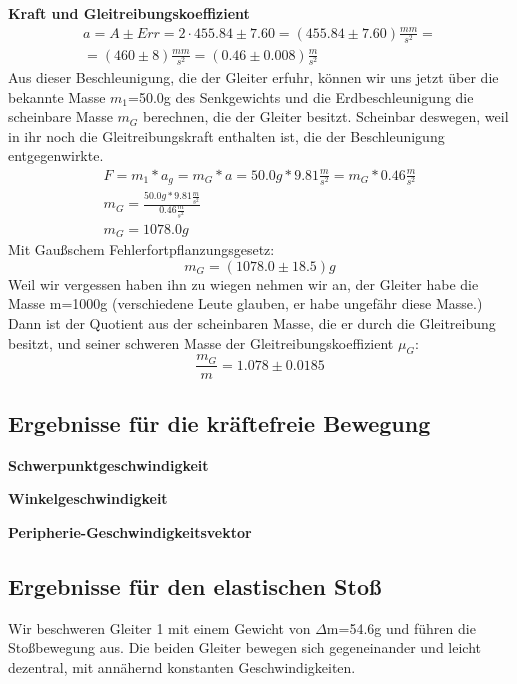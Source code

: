 \documentclass{article}
\begin{document}
\textbf{Kraft und Gleitreibungskoeffizient}
\begin{gather*}
a=A\pm Err=2\cdot 455.84 \pm 7.60=(455.84\pm 7.60)\frac{mm}{s^2}= \\
=(460\pm8)\frac{mm}{s^2}=(0.46\pm0.008)\frac{m}{s^2}
\end{gather*}
Aus dieser Beschleunigung, die der Gleiter erfuhr, können wir uns jetzt über die bekannte Masse $m_1$=50.0g des Senkgewichts und die Erdbeschleunigung die scheinbare Masse $m_G$ berechnen, die der Gleiter besitzt. Scheinbar deswegen, weil in ihr noch die Gleitreibungskraft enthalten ist, die der Beschleunigung entgegenwirkte.
\begin{gather}
F=m_1*a_g=m_G*a=50.0g*9.81\frac{m}{s^2}=m_G*0.46\frac{m}{s^2} \\
m_G=\frac{50.0g*9.81\frac{m}{s^2}}{0.46\frac{m}{s^2}} \\
m_G=1078.0g
\end{gather}
Mit Gaußschem Fehlerfortpflanzungsgesetz:
\begin{equation}
m_G=(1078.0 \pm18.5)g
\end{equation}
Weil wir vergessen haben ihn zu wiegen nehmen wir an, der Gleiter habe die Masse m=1000g (verschiedene Leute glauben, er habe ungefähr diese Masse.) Dann ist der Quotient aus der scheinbaren Masse, die er durch die Gleitreibung besitzt, und seiner schweren Masse der Gleitreibungskoeffizient $\mu_G$:
\begin{equation}
\frac{m_G}{m}=1.078\pm0.0185
\end{equation}


\subsection{Ergebnisse für die kräftefreie Bewegung}

\textbf{Schwerpunktgeschwindigkeit}

\textbf{Winkelgeschwindigkeit}

\textbf{Peripherie-Geschwindigkeitsvektor}


\subsection{Ergebnisse für den elastischen Stoß}

Wir beschweren Gleiter 1 mit einem Gewicht von $\Delta$m=54.6g und führen die Stoßbewegung aus. Die beiden Gleiter bewegen sich gegeneinander und leicht dezentral, mit annähernd konstanten Geschwindigkeiten. \\
\end{document}
